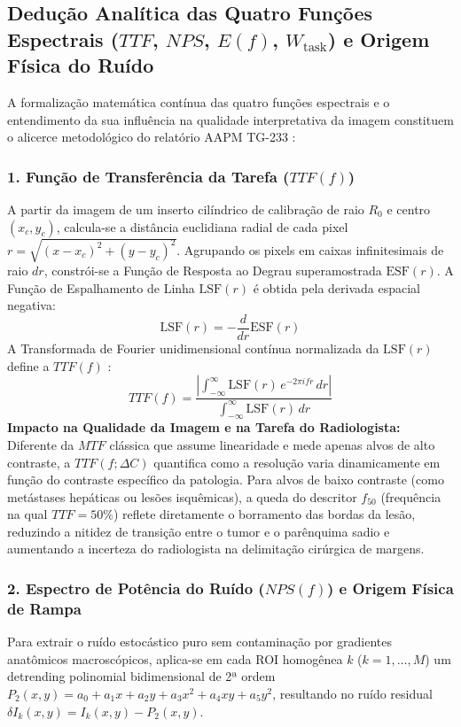\documentclass[
  12pt,
  a4paper,
  oneside
]{report}
\begin{document}
\subsection{Dedução Analítica das Quatro Funções Espectrais (\texorpdfstring{$TTF$, $NPS$, $E(f)$, $W_{\text{task}}$}{TTF, NPS, E(f), Wtask}) e Origem Física do Ruído}
\label{subsec:deducoes_passo_passo_quatro_funcoes_unificado}
A formalização matemática contínua das quatro funções espectrais e o entendimento da sua influência na qualidade interpretativa da imagem constituem o alicerce metodológico do relatório AAPM TG-233 \cite{aapm_tg233_2019}:

\subsubsection{1. Função de Transferência da Tarefa (\texorpdfstring{$TTF(f)$}{TTF(f)})}
A partir da imagem de um inserto cilíndrico de calibração de raio $R_0$ e centro $(x_c, y_c)$, calcula-se a distância euclidiana radial de cada pixel $r = \sqrt{(x - x_c)^2 + (y - y_c)^2}$. Agrupando os pixels em caixas infinitesimais de raio $dr$, constrói-se a Função de Resposta ao Degrau superamostrada $\text{ESF}(r)$. A Função de Espalhamento de Linha $\text{LSF}(r)$ é obtida pela derivada espacial negativa:
\begin{equation}
  \text{LSF}(r) = -\frac{d}{dr} \text{ESF}(r)
  \label{eq:lsf_derivada}
\end{equation}
A Transformada de Fourier unidimensional contínua normalizada da $\text{LSF}(r)$ define a $TTF(f)$ \cite{aapm_tg233_2019, racine2020}:
\begin{equation}
  TTF(f) = \frac{\left| \int_{-\infty}^{\infty} \text{LSF}(r) \, e^{-2\pi i f r} \, dr \right|}{\int_{-\infty}^{\infty} \text{LSF}(r) \, dr}
  \label{eq:ttf_integral_deducao}
\end{equation}
\textbf{Impacto na Qualidade da Imagem e na Tarefa do Radiologista:} Diferente da $MTF$ clássica que assume linearidade e mede apenas alvos de alto contraste, a $TTF(f; \Delta C)$ quantifica como a resolução varia dinamicamente em função do contraste específico da patologia. Para alvos de baixo contraste (como metástases hepáticas ou lesões isquêmicas), a queda do descritor $f_{50}$ (frequência na qual $TTF = 50\%$) reflete diretamente o borramento das bordas da lesão, reduzindo a nitidez de transição entre o tumor e o parênquima sadio e aumentando a incerteza do radiologista na delimitação cirúrgica de margens.

\subsubsection{2. Espectro de Potência do Ruído (\texorpdfstring{$NPS(f)$}{NPS(f)}) e Origem Física de Rampa}
Para extrair o ruído estocástico puro sem contaminação por gradientes anatômicos macroscópicos, aplica-se em cada ROI homogênea $k$ ($k = 1, \dots, M$) um detrending polinomial bidimensional de 2ª ordem $P_2(x, y) = a_0 + a_1 x + a_2 y + a_3 x^2 + a_4 xy + a_5 y^2$, resultando no ruído residual $\delta I_k(x, y) = I_k(x, y) - P_2(x, y)$.
\end{document}
